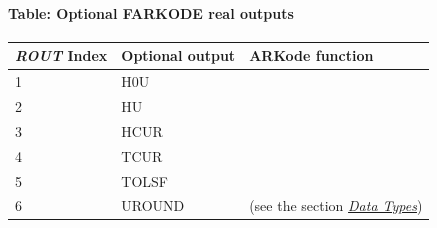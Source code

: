 \documentclass[letterpaper,10pt,english]{sphinxmanual}
\begin{document}
\paragraph{Table: Optional FARKODE real outputs}
\label{f_interface/Optional_output:table-optional-farkode-real-outputs}\label{f_interface/Optional_output:finterface-routtable}
\begin{tabulary}{\linewidth}{|L|L|L|}
\hline
\textbf{
\emph{ROUT} Index
} & \textbf{
Optional output
} & \textbf{
ARKode function
}\\\hline

1
 & 
H0U
 & 
{\hyperref[c_interface/User_callable:ARKodeGetActualInitStep]{}}
\\\hline

2
 & 
HU
 & 
{\hyperref[c_interface/User_callable:ARKodeGetLastStep]{}}
\\\hline

3
 & 
HCUR
 & 
{\hyperref[c_interface/User_callable:ARKodeGetCurrentStep]{}}
\\\hline

4
 & 
TCUR
 & 
{\hyperref[c_interface/User_callable:ARKodeGetCurrentTime]{}}
\\\hline

5
 & 
TOLSF
 & 
{\hyperref[c_interface/User_callable:ARKodeGetTolScaleFactor]{}}
\\\hline

6
 & 
UROUND
 & 
 (see the section {\hyperref[c_interface/General:cinterface-datatypes]{\emph{Data Types}}})
\\\hline
\end{tabulary}
\end{document}
